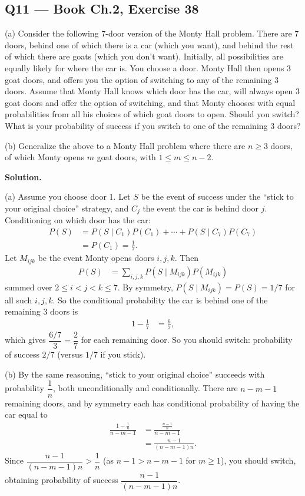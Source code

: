 \documentclass[11pt]{article}
\begin{document}
\subsection*{Q11 --- Book Ch.2, Exercise 38}
\begin{qbox}
(a) Consider the following 7-door version of the Monty Hall problem. There are 7 doors, behind one of which there is a car (which you want), and behind the rest of which there are goats (which you don't want). Initially, all possibilities are equally likely for where the car is. You choose a door. Monty Hall then opens 3 goat doors, and offers you the option of switching to any of the remaining 3 doors.
Assume that Monty Hall knows which door has the car, will always open 3 goat doors and offer the option of switching, and that Monty chooses with equal probabilities from all his choices of which goat doors to open. Should you switch? What is your probability of success if you switch to one of the remaining 3 doors?

(b) Generalize the above to a Monty Hall problem where there are $n \geq 3$ doors, of which Monty opens $m$ goat doors, with $1 \leq m \leq n-2$.
\end{qbox}
\textbf{Solution.}

(a) Assume you choose door 1. Let $S$ be the event of success under the ``stick to your original choice'' strategy, and $C_j$ the event the car is behind door $j$. Conditioning on which door has the car:
\begin{align*}
P(S) &= P(S\mid C_1)P(C_1) + \cdots + P(S\mid C_7)P(C_7) \\
&= P(C_1) = \frac{1}{7}.
\end{align*}
Let $M_{ijk}$ be the event Monty opens doors $i,j,k$. Then
\begin{align*}
P(S) &= \sum_{i,j,k} P(S\mid M_{ijk})P(M_{ijk})
\end{align*}
summed over $2 \le i<j<k\le 7$. By symmetry, $P(S\mid M_{ijk}) = P(S) = 1/7$ for all such $i,j,k$. So the conditional probability the car is behind one of the remaining 3 doors is
\begin{align*}
1 - \frac{1}{7} &= \frac{6}{7},
\end{align*}
which gives $\dfrac{6/7}{3} = \dfrac{2}{7}$ for each remaining door. So you should switch: probability of success $2/7$ (versus $1/7$ if you stick).

(b) By the same reasoning, ``stick to your original choice'' succeeds with probability $\dfrac1n$, both unconditionally and conditionally. There are $n-m-1$ remaining doors, and by symmetry each has conditional probability of having the car equal to
\begin{align*}
\frac{1 - \tfrac1n}{n-m-1} &= \frac{\tfrac{n-1}{n}}{n-m-1} \\
&= \frac{n-1}{(n-m-1)n}.
\end{align*}
Since $\dfrac{n-1}{(n-m-1)n} > \dfrac1n$ (as $n - 1 > n - m -1$ for $m\ge 1$), you should switch, obtaining probability of success $\dfrac{n-1}{(n-m-1)n}$.
\end{document}
